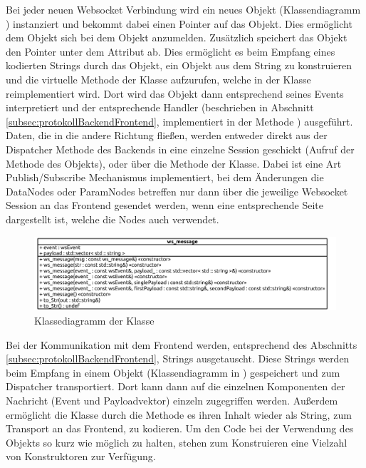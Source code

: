 Bei jeder neuen Websocket Verbindung wird ein neues  Objekt (Klassendiagramm ) instanziert 
und bekommt dabei einen Pointer auf das  Objekt. Dies ermöglicht dem  Objekt 
sich bei dem  Objekt anzumelden. 
Zusätzlich speichert das  Objekt den Pointer unter dem Attribut  ab.
Dies ermöglicht es beim Empfang eines kodierten Strings durch das  Objekt, ein  Objekt aus dem String zu konstruieren
und die virtuelle Methode  der  Klasse aufzurufen, welche in der  Klasse reimplementiert wird.
Dort wird das  Objekt dann entsprechend seines Events interpretiert und der entsprechende Handler (beschrieben in Abschnitt \ref{subsec:protokollBackendFrontend}, 
implementiert in der Methode ) ausgeführt.
Daten, die in die andere Richtung fließen, werden entweder direkt aus der Dispatcher Methode des Backends in eine einzelne Session geschickt (Aufruf der Methode  des  Objekts), 
oder über die Methode  der  Klasse.
Dabei ist eine Art Publish/Subscribe Mechanismus implementiert, bei dem Änderungen die DataNodes oder ParamNodes betreffen nur dann über die jeweilige Websocket Session an das Frontend gesendet werden, 
wenn eine entsprechende Seite dargestellt ist, welche die Nodes auch verwendet.
\begin{figure}[ht]
  \centering
  \includegraphics[width=\textwidth]{content/hauptteil/umsetzungPoC/backend/uml/classesOfOverview/ws_message.pdf}
  \caption{Klassediagramm der Klasse }
  \label{fig:backend:classDiag:wsMsg}
\end{figure}
Bei der Kommunikation mit dem Frontend werden, entsprechend des Abschnitts \ref{subsec:protokollBackendFrontend}, Strings ausgetauscht. 
Diese Strings werden beim Empfang in einem  Objekt (Klassendiagramm in ) gespeichert und zum Dispatcher transportiert. 
Dort kann dann auf die einzelnen Komponenten der Nachricht (Event und Payloadvektor) einzeln zugegriffen werden.
Außerdem ermöglicht die Klasse durch die Methode  es ihren Inhalt wieder als String, zum Transport an das Frontend, zu kodieren.
Um den Code bei der Verwendung des  Objekts so kurz wie möglich zu halten, stehen zum Konstruieren eine Vielzahl von Konstruktoren zur Verfügung.
